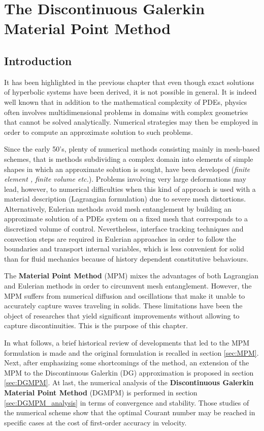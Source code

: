 \chapter{The Discontinuous Galerkin Material Point Method}

\section*{Introduction}
It has been highlighted in the previous chapter that even though exact solutions of hyperbolic systems have been derived, it is not possible in general. It is indeed well known that in addition to the mathematical complexity of PDEs, physics often involves multidimensional problems in domains with complex geometries that cannot be solved analytically. Numerical strategies may then be employed in order to compute an approximate solution to such problems.

Since the early 50's, plenty of numerical methods consisting mainly in mesh-based schemes, that is methods subdividing a complex domain into elements of simple shapes in which an approximate solution is sought, have been developed (\textit{finite element \cite{Belytschko}, finite volume \cite{Leveque} etc.}). Problems involving very large deformations may lead, however, to numerical difficulties when this kind of approach is used with a material description (Lagrangian formulation) due to severe mesh distortions. Alternatively, Eulerian methods avoid mesh entanglement by building an approximate solution of a PDEs system on a fixed mesh that corresponds to a discretized volume of control. Nevertheless, interface tracking techniques and convection steps are required in Eulerian approaches in order to follow the boundaries and transport internal variables, which is less convenient for solid than for fluid mechanics because of history dependent constitutive behaviours.

The \textbf{Material Point Method} (MPM) \cite{Sulsky94} mixes the advantages of both Lagrangian and Eulerian methods in order to circumvent mesh entanglement. However, the MPM suffers from numerical diffusion and oscillations that make it unable to accurately capture waves traveling in solids. These limitations have been the object of researches that yield significant improvements without allowing to capture discontinuities. This is the purpose of this chapter.

In what follows, a brief historical review of developments that led to the MPM formulation is made and the original formulation is recalled in section \ref{sec:MPM}. Next, after emphasizing some shortcomings of the method, an extension of the MPM to the Discontinuous Galerkin (DG) approximation is proposed in section \ref{sec:DGMPM}. At last, the numerical analysis of the \textbf{Discontinuous Galerkin Material Point Method} (DGMPM) is performed in section \ref{sec:DGMPM_analysis} in terms of convergence and stability. Those studies of the numerical scheme show that the optimal Courant number may be reached in specific cases at the cost of first-order accuracy in velocity.



